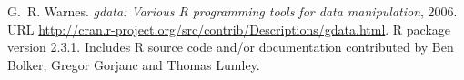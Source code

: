 \documentclass[a4paper]{report}
\begin{document}
\begin{article}
\begin{thebibliography}{1}
G.~R. Warnes.
\newblock \emph{gdata: Various R programming tools for data manipulation},
  2006.
\newblock URL
  \url{http://cran.r-project.org/src/contrib/Descriptions/gdata.html}.
\newblock R package version 2.3.1. Includes R source code and/or documentation
  contributed by Ben Bolker, Gregor Gorjanc and Thomas Lumley.

\end{thebibliography}

\address{Gregor Gorjanc\\
  University of Ljubljana, Slovenia\\
}

\end{article}
\end{document}
